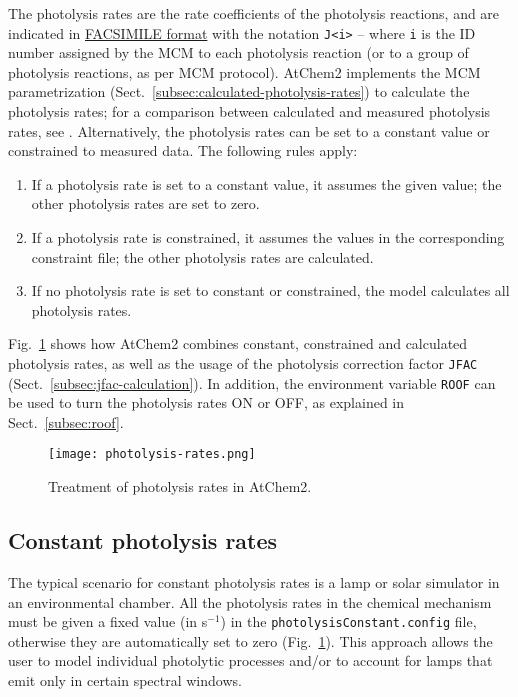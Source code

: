 The photolysis rates are the rate coefficients of the photolysis reactions,
and are indicated in \hyperref[subsec:facsimile-format]{FACSIMILE format}
with the notation \texttt{J<i>} -- where \texttt{i} is the ID number
assigned by the MCM to each photolysis reaction (or to a group of
photolysis reactions, as per MCM protocol). AtChem2 implements the MCM
parametrization (Sect.~\ref{subsec:calculated-photolysis-rates}) to
calculate the photolysis rates; for a comparison between calculated
and measured photolysis rates, see \citet{sommariva_2020}.
Alternatively, the photolysis rates can be set to a constant value or
constrained to measured data. The following rules apply:

\begin{enumerate}
\item If a photolysis rate is set to a constant value, it assumes the
  given value; the other photolysis rates are set to zero.
\item If a photolysis rate is constrained, it assumes the values in
  the corresponding constraint file; the other photolysis rates are
  calculated.
\item If no photolysis rate is set to constant or constrained, the
  model calculates all photolysis rates.
\end{enumerate}

Fig.~\ref{fig:photol} shows how AtChem2 combines constant, constrained
and calculated photolysis rates, as well as the usage of the photolysis
correction factor \texttt{JFAC} (Sect.~\ref{subsec:jfac-calculation}).
In addition, the environment variable \texttt{ROOF} can be used to turn
the photolysis rates ON or OFF, as explained in Sect.~\ref{subsec:roof}.

\begin{figure}[htb]
  \centering
  \texttt{[image: photolysis-rates.png]}
  \caption{Treatment of photolysis rates in AtChem2.}
  \label{fig:photol}
\end{figure}

\subsection{Constant photolysis rates} \label{subsec:constant-photolysis-rates}

The typical scenario for constant photolysis rates is a lamp or solar
simulator in an environmental chamber. All the photolysis rates in the
chemical mechanism must be given a fixed value (in s$^{-1}$) in the
\texttt{photolysisConstant.config} file, otherwise they are
automatically set to zero (Fig.~\ref{fig:photol}). This approach
allows the user to model individual photolytic processes and/or to
account for lamps that emit only in certain spectral windows.

